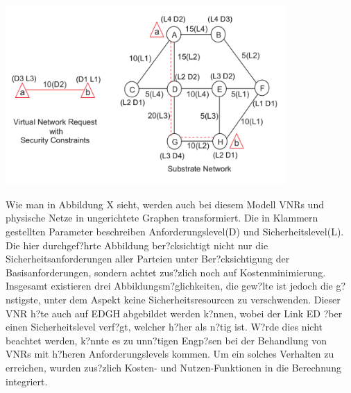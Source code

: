 \documentclass{lni}
\begin{document}
\begin{center}
	\includegraphics[width=0.8\textwidth]{algo2graph.pdf}\newline
\end{center}
Wie man in Abbildung X sieht, werden auch bei diesem Modell VNRs und physische Netze in ungerichtete Graphen transformiert. Die in Klammern gestellten Parameter beschreiben Anforderungslevel(D) und Sicherheitslevel(L). Die hier durchgef?hrte Abbildung ber?cksichtigt nicht nur die Sicherheitsanforderungen aller Parteien unter Ber?cksichtigung der Basisanforderungen, sondern achtet zus?zlich noch auf Kostenminimierung. Insgesamt existieren drei Abbildungsm?glichkeiten, die gew?lte ist jedoch die g?nstigste, unter dem Aspekt keine Sicherheitsresourcen zu verschwenden. Dieser VNR h?te auch auf EDGH abgebildet werden k?nnen, wobei der Link ED ?ber einen Sicherheitslevel verf?gt, welcher h?her als n?tig ist. W?rde dies nicht beachtet werden, k?nnte es zu unn?tigen Engp?sen bei der Behandlung von VNRs mit h?heren Anforderungslevels kommen. Um ein solches Verhalten zu erreichen, wurden zus?zlich Kosten- und Nutzen-Funktionen in die Berechnung integriert.
\end{document}
